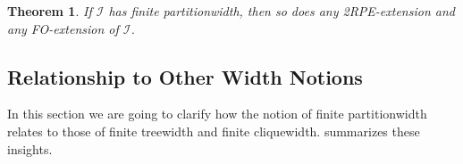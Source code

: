 \documentclass[10pt,a4paper]{amsart}
\theoremstyle{definition}
\numberwithin{equation}{section}
\theoremstyle{plain}
\newtheorem{theorem}[theorem]{Theorem}
\theoremstyle{definition}
\theoremstyle{myexample}
\theoremstyle{plain}
\theoremstyle{definition}
\newcommand{\instance}{\mathcal{I}}
\newcommand{\inst}{\instance}
\newcommand{\ercwidth}{\partitionwidth}
\newcommand{\hypercliquewidth}{\partitionwidth}
\newcommand{\partitionwidth}{par\-ti\-tion\-width}
\begin{document}
\begin{theorem}\label{thm:closureproperties}
If $\inst$ has finite \hypercliquewidth{}, then so does any 2RPE-extension and any FO-extension of $\inst$.
\end{theorem}




 


\subsection{Relationship to Other Width Notions}\label{sec:hcw-vs-tw-cw}

In this section we are going to clarify how the notion of finite \ercwidth{} relates to those of finite treewidth and finite cliquewidth. 
 summarizes these insights.
\end{document}
